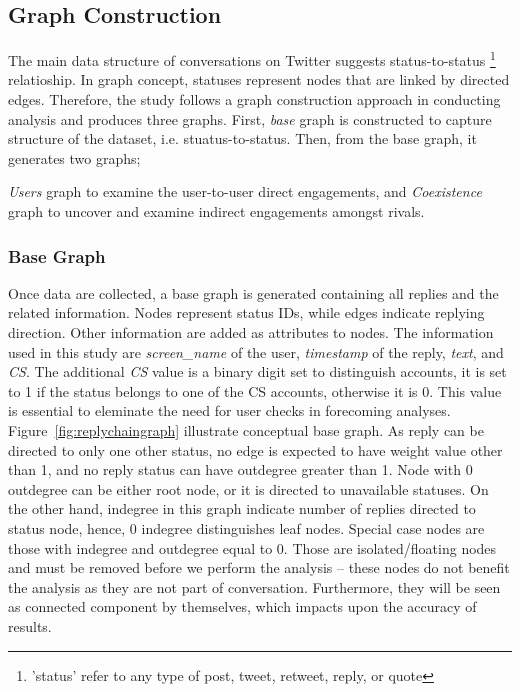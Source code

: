 \documentclass[sigconf]{acmart}
\begin{document}
\subsection{Graph Construction}
The main data structure of conversations on Twitter suggests status-to-status
{\footnote{'status' refer to any type of post, tweet, retweet, reply, or quote}} 
relatioship. In graph concept, statuses represent nodes that are linked by 
directed edges. Therefore, the study follows a graph construction approach 
in conducting analysis and produces three graphs. First, {\emph{base}} 
graph is constructed to capture structure of the dataset, i.e. stuatus-to-status. 
Then, from the base graph, it generates two graphs; {\emph{Users} 
graph to examine the user-to-user direct engagements, and {\emph{Coexistence}} 
graph to uncover and examine indirect engagements amongst rivals. 

\subsubsection{Base Graph}

Once data are collected, a base graph is generated 
containing all replies and the related information. Nodes represent status IDs, 
while edges indicate replying direction. Other information  
are added as attributes to nodes. The information used in this study 
are {\emph{screen\_name}} of the user, {\emph{timestamp}} of the 
reply, {\emph{text}}, and {\emph{CS}}. The additional {\emph{CS}} 
value is a binary digit set to distinguish accounts, it is set to 1 if the status belongs to 
one of the CS accounts, otherwise it is 0. This value is essential to eleminate the need 
for user checks in forecoming analyses. Figure~\ref{fig:replychaingraph} 
illustrate conceptual base graph. As reply can be directed to only one 
other status, no edge is expected to have weight value other than 1, and no reply
status can have outdegree greater than 1. Node with 0 outdegree can be either
root node, or it is directed to unavailable statuses. On the other hand, indegree in 
this graph indicate number of replies directed to status node, hence, 0 indegree 
distinguishes leaf nodes. Special case nodes are those with indegree and outdegree equal
to 0. Those are isolated/floating nodes and must be removed before we
perform the analysis -- these nodes do not benefit the analysis as
they are not part of conversation. Furthermore, they will be seen
as connected component by themselves, which impacts upon the accuracy
of results.

}
\end{document}
